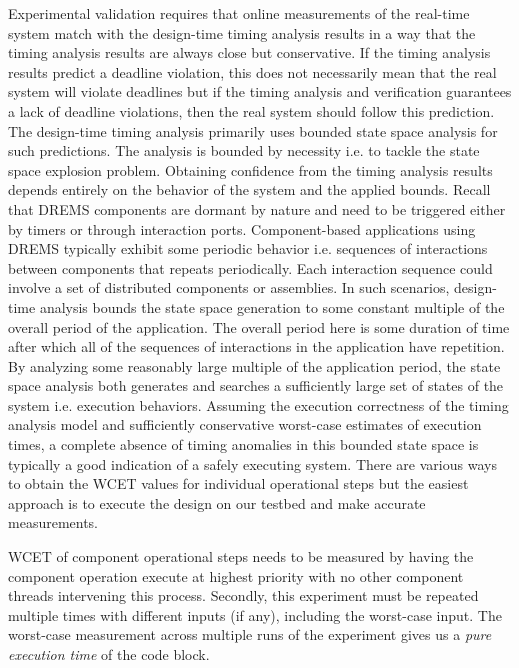 Experimental validation requires that online measurements of the real-time system match with the design-time timing analysis results in a way that the timing analysis results are always close but conservative. If the timing analysis results predict a deadline violation, this does not necessarily mean that the real system will violate deadlines but if the timing analysis and verification guarantees a lack of deadline violations, then the real system should follow this prediction. The design-time timing analysis primarily uses bounded state space analysis for such predictions. The analysis is bounded by necessity i.e. to tackle the state space explosion problem. Obtaining confidence from the timing analysis results depends entirely on the behavior of the system and the applied bounds. Recall that DREMS components are dormant by nature and need to be triggered either by timers or through interaction ports. Component-based applications using DREMS typically exhibit some periodic behavior i.e. sequences of interactions between components that repeats periodically. Each interaction sequence could involve a set of distributed components or assemblies. In such scenarios, design-time analysis bounds the state space generation to some constant multiple of the overall period of the application. The overall period here is some duration of time after which all of the sequences of interactions in the application have repetition. By analyzing some reasonably large multiple of the application period, the state space analysis both generates and searches a sufficiently large set of states of the system i.e. execution behaviors. Assuming the execution correctness of the timing analysis model and sufficiently conservative worst-case estimates of execution times, a complete absence of timing anomalies in this bounded state space is typically a good indication of a safely executing system. There are various ways to obtain the WCET values for individual operational steps but the easiest approach is to execute the design on our testbed and make accurate measurements.


WCET of component operational steps needs to be measured by having the component operation execute at highest priority with no other component threads intervening this process. Secondly, this experiment must be repeated multiple times with different inputs (if any), including the worst-case input. The worst-case measurement across multiple runs of the experiment gives us a \emph{pure execution time} of the code block. 

